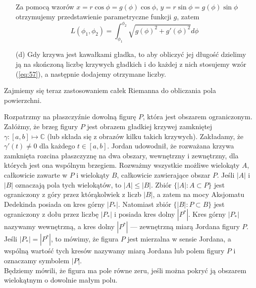 \documentclass[leqno]{article}
\begin{document}
\begin{justify}
\begin{uwaga}
\begin{itemize}
            Za pomocą wzorów $x = r\cos \phi = g(\phi)\cos \phi$, $y = r\sin \phi = g(\phi)\sin \phi$ otrzymujemy przedstawienie parametryczne funkcji $g$, zatem
            \[
                L(\phi_1, \phi_2) = \int_{\phi_1}^{\phi_2} \sqrt{g(\phi)^2 + g'(\phi)^2}d\phi
            \]
        \item [(d)]
            Gdy krzywa jest kawałkami gładka, to aby obliczyć jej długość dzielimy ją na skończoną liczbę krzywych gładkich i do każdej z nich stosujemy wzór (\ref{eq:57}), a następnie dodajemy otrzymane liczby.
    \end{itemize}
\end{uwaga}

Zajmiemy się teraz zastosowaniem całek Riemanna do obliczania pola powierzchni.

\begin{defn}
    Rozpatrzmy na płaszczyźnie dowolną figurę $P$, która jest obszarem ograniczonym. 
    Załóżmy, że brzeg figury $P$ jest obrazem gładkiej krzywej zamkniętej $\gamma : [a,b] \mapsto \mathbb{C}$ (lub składa się z obrazów kilku takich krzywych).
    Zakładamy, że $\gamma'(t) \neq 0$ dla każdego $t \in [a,b]$. Jordan udowodnił, że rozważana krzywa zamknięta rozcina płaszczyznę na dwa obszary,
    wewnętrzny i zewnętrzny, dla których jest ona wspólnym brzegiem. Rozważmy wszystkie możliwe wielokąty $A$, całkowicie zawarte w $P$ i wielokąty $B$, całkowicie zawierające obszar $P$.
    Jeśli $|A|$ i $|B|$ oznaczają pola tych wielokątów, to $|A| \leqslant |B|$. Zbiór $\{|A| : A \subset P\}$ jest ograniczony z góry przez którąkolwiek z liczb $|B|$, a zatem na mocy
    Aksjomatu Dedekinda posiada on kres górny $|P_*|$. Natomiast zbiór $\{|B| : P \subset B\}$ jest ograniczony z dołu przez liczbę $|P_*|$ i posiada kres dolny $|P^*|$. Kres
    górny $|P_*|$ nazywamy wewnętrzną, a kres dolny $|P^*|$ --- zewnętrzną miarą Jordana figury $P$. \\
    Jeśli $|P_*| = |P^*|$, to mówimy, że figura $P$ jest mierzalna w sensie Jordana, a wspólną wartość tych kresów nazywamy miarą Jordana lub polem figury $P$ i oznaczamy symbolem $|P|$. \\
    Będziemy mówili, że figura ma pole równe zeru, jeśli można pokryć ją obszarem wielokątnym o dowolnie małym polu. 
\end{defn}

\end{justify}
\end{document}
